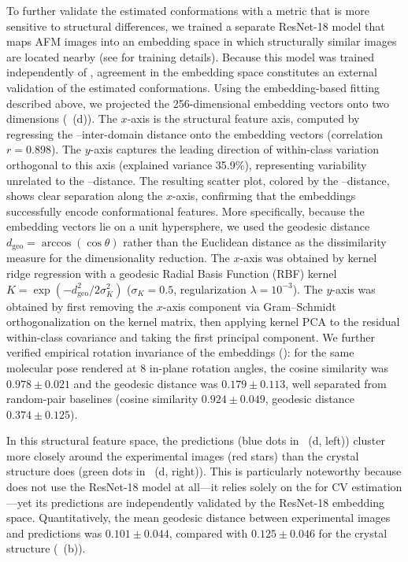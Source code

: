To further validate the estimated conformations with a metric that is more sensitive to structural differences, we trained a separate ResNet-18 model \cite{He2016} that maps AFM images into an embedding space in which structurally similar images are located nearby (see  for training details).
Because this model was trained independently of \Model, agreement in the embedding space constitutes an external validation of the estimated conformations.
Using the embedding-based fitting described above, we projected the 256-dimensional embedding vectors onto two dimensions (~(d)).
The $x$-axis is the structural feature axis, computed by regressing the \acdii--\acdiv inter-domain distance onto the embedding vectors (correlation $r = 0.898$).
The $y$-axis captures the leading direction of within-class variation orthogonal to this axis (explained variance 35.9\%), representing variability unrelated to the \acdii--\acdiv distance.
The resulting scatter plot, colored by the \acdii--\acdiv distance, shows clear separation along the $x$-axis, confirming that the embeddings successfully encode conformational features.
More specifically, because the embedding vectors lie on a unit hypersphere, we used the geodesic distance $d_{\mathrm{geo}} = \arccos(\cos\theta)$ rather than the Euclidean distance as the dissimilarity measure for the dimensionality reduction.
The $x$-axis was obtained by kernel ridge regression with a geodesic Radial Basis Function (RBF) kernel $K = \exp(-d_{\mathrm{geo}}^2 / 2\sigma_K^2)$ ($\sigma_K = 0.5$, regularization $\lambda = 10^{-3}$).
The $y$-axis was obtained by first removing the $x$-axis component via Gram--Schmidt orthogonalization on the kernel matrix, then applying kernel PCA to the residual within-class covariance and taking the first principal component.
We further verified empirical rotation invariance of the embeddings (): for the same molecular pose rendered at 8 in-plane rotation angles, the cosine similarity was $0.978 \pm 0.021$ and the geodesic distance was $0.179 \pm 0.113$, well separated from random-pair baselines (cosine similarity $0.924 \pm 0.049$, geodesic distance $0.374 \pm 0.125$).

In this structural feature space, the \Model predictions (blue dots in ~(d, left)) cluster more closely around the experimental images (red stars) than the crystal structure does (green dots in ~(d, right)).
This is particularly noteworthy because \Model does not use the ResNet-18 model at all---it relies solely on the \gcnn for CV estimation---yet its predictions are independently validated by the ResNet-18 embedding space.
Quantitatively, the mean geodesic distance between experimental images and \Model predictions was $0.101 \pm 0.044$, compared with $0.125 \pm 0.046$ for the crystal structure (~(b)).

